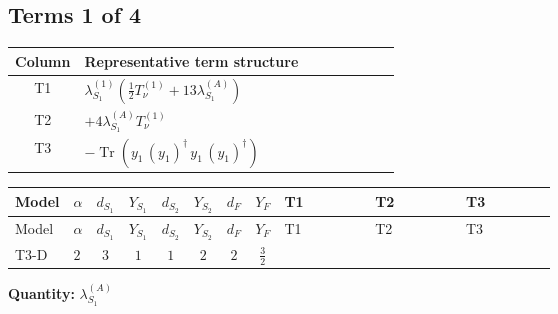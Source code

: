 \documentclass[8pt]{article}
\begin{document}
\begin{landscape}
\subsection*{Terms 1 of 4}
\begin{center}
\begin{tabular}{@{}c >{\raggedright\arraybackslash}p{0.82\linewidth}@{}}
\toprule
Column & Representative term structure \\
\midrule
T1 & \(\displaystyle {\lambda_{S_1}^{(1)}} \left(\frac{1}{2} T_{\nu}^{(1)}+13 {\lambda_{S_1}^{(A)}}\right)\) \\
\midrule
T2 & \(\displaystyle +4 {\lambda_{S_1}^{(A)}} T_{\nu}^{(1)}\) \\
\midrule
T3 & \(\displaystyle -\operatorname{Tr}\!\left({y_1}\,\left({y_1}\right)^{\dagger}\,{y_1}\,\left({y_1}\right)^{\dagger}\right)\) \\
\midrule
\bottomrule
\end{tabular}
\end{center}
\smallskip
\tiny
\begin{longtable}{@{}llcccccc >{\raggedright\arraybackslash}p{0.21\linewidth} >{\raggedright\arraybackslash}p{0.21\linewidth} >{\raggedright\arraybackslash}p{0.21\linewidth}@{}}
\toprule
Model & $\alpha$ & $d_{S_1}$ & $Y_{S_1}$ & $d_{S_2}$ & $Y_{S_2}$ & $d_F$ & $Y_F$ & T1 & T2 & T3 \\
\midrule
\endfirsthead
\toprule
Model & $\alpha$ & $d_{S_1}$ & $Y_{S_1}$ & $d_{S_2}$ & $Y_{S_2}$ & $d_F$ & $Y_F$ & T1 & T2 & T3 \\
\midrule
\endhead
T3-D & $2$ & $3$ & $1$ & $1$ & $2$ & $2$ & $\frac{3}{2}$ & \scriptsize\adjustbox{max width=\linewidth}{$\begin{gathered} {\lambda_{S_1}^{(1)}} \left(\frac{1}{2} T_{\nu}^{(1)}+13 {\lambda_{S_1}^{(A)}}\right)\end{gathered}$} & \scriptsize\adjustbox{max width=\linewidth}{$\begin{gathered} +4 {\lambda_{S_1}^{(A)}} T_{\nu}^{(1)}\end{gathered}$} & \scriptsize\adjustbox{max width=\linewidth}{$\begin{gathered} -\operatorname{Tr}\!\left({y_1}\,\left({y_1}\right)^{\dagger}\,{y_1}\,\left({y_1}\right)^{\dagger}\right)\end{gathered}$} \\
\midrule
\bottomrule
\end{longtable}
\clearpage
\noindent\textbf{Quantity: }$\lambda_{S_1}^{(A)}$\par\smallskip

\end{landscape}
\end{document}
